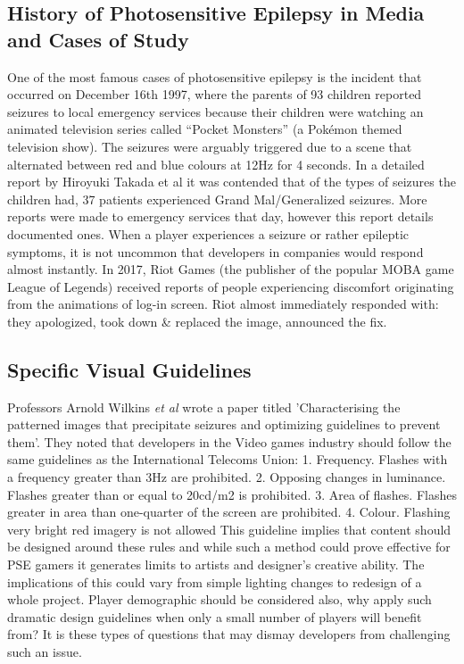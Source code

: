 \documentclass[twocolumn, 10pt, conference]{ieeetran}
\begin{document}
\subsection{History of Photosensitive Epilepsy in Media and Cases of Study}
One of the most famous cases of photosensitive epilepsy is the incident that occurred on December 16th 1997, where the parents of 93 children reported seizures to local emergency services because their children were watching an animated television series called “Pocket Monsters” (a Pokémon themed television show). The seizures were arguably triggered due to a scene that alternated between red and blue colours at 12Hz for 4 seconds. In a detailed report by Hiroyuki Takada et al it was contended that of the types of seizures the children had, 37 patients experienced Grand Mal/Generalized seizures. More reports were made to emergency services that day, however this report details documented ones.
When a player experiences a seizure or rather epileptic symptoms, it is not uncommon that developers in companies would respond almost instantly. In 2017, Riot Games (the publisher of the popular MOBA game League of Legends) received reports of people experiencing discomfort originating from the animations of log-in screen. Riot almost immediately responded with: they apologized, took down \& replaced the image, announced the fix\cite{Kudos}. 

\subsection{Specific Visual Guidelines}
Professors Arnold Wilkins \textit{et al} wrote a paper titled 'Characterising the patterned images that precipitate seizures and optimizing guidelines to prevent them'. They noted that developers in the Video games industry should follow the same guidelines as the International Telecoms Union:
1. Frequency. Flashes with a frequency greater than 3Hz are prohibited. 
2. Opposing changes in luminance. Flashes greater than or equal to 20cd/m2 is prohibited.
3. Area of flashes. Flashes greater in area than one-quarter of the screen are prohibited. 
4. Colour. Flashing very bright red imagery is not allowed
\cite{wilkins2005characterizing} This guideline implies that content should be designed around these rules and while such a method could prove effective for PSE gamers it generates limits to artists and designer’s creative ability. The implications of this could vary from simple lighting changes to redesign of a whole project. Player demographic should be considered also, why apply such dramatic design guidelines when only a small number of players will benefit from? It is these types of questions that may dismay developers from challenging such an issue.
\end{document}
